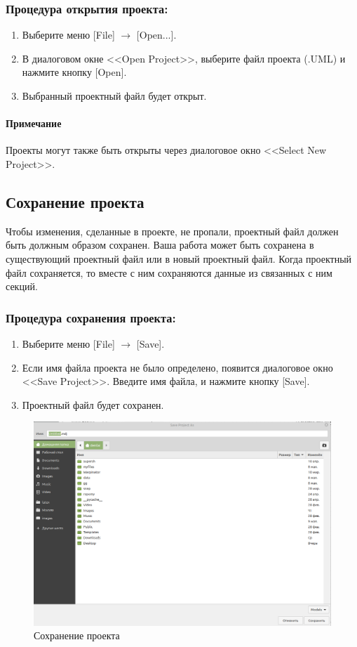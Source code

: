 \documentclass[a4paper,12pt]{extreport}
\begin{document}
\subsubsection*{Процедура открытия проекта:}
\begin{enumerate}
	\item Выберите меню [File] $\to$ [Open...].
	\item В диалоговом окне <<Open Project>>, выберите файл проекта (.UML) и нажмите кнопку
	[Open].
	\item Выбранный проектный файл будет открыт.
\end{enumerate}

\paragraph{Примечание}
Проекты могут также быть открыты через диалоговое окно <<Select New Project>>.

\subsection*{Сохранение проекта}
Чтобы изменения, сделанные в проекте, не пропали, проектный файл должен быть должным
образом сохранен. Ваша работа может быть сохранена в существующий проектный файл или в 
новый проектный файл. Когда проектный файл сохраняется, то вместе с ним сохраняются данные
из связанных с ним секций.
\subsubsection*{Процедура сохранения проекта:}
\begin{enumerate}
	\item Выберите меню [File] $\to$ [Save].
	\item Если имя файла проекта не было определено, появится диалоговое окно <<Save Project>>.
	Введите имя файла, и нажмите кнопку [Save].
	\item Проектный файл будет сохранен.
\end{enumerate}


\begin{figure}[h!]
	\centering
	\includegraphics[width=0.5\linewidth]{images/saveproject}
	\caption{Сохранение проекта}
	\label{fig:saveproject}
\end{figure}
\end{document}
